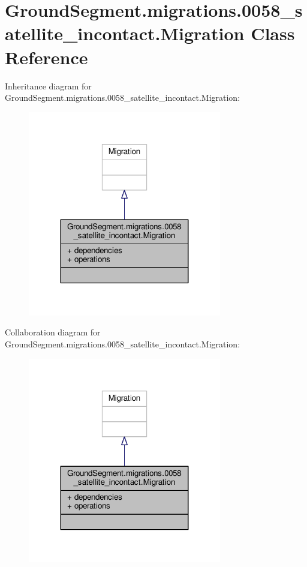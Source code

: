 \hypertarget{class_ground_segment_1_1migrations_1_10058__satellite__incontact_1_1_migration}{}\section{Ground\+Segment.\+migrations.0058\+\_\+satellite\+\_\+incontact.Migration Class Reference}
\label{class_ground_segment_1_1migrations_1_10058__satellite__incontact_1_1_migration}


Inheritance diagram for Ground\+Segment.\+migrations.0058\+\_\+satellite\+\_\+incontact.Migration\+:\nopagebreak
\begin{figure}[H]
\begin{center}
\leavevmode
\includegraphics[width=239pt]{class_ground_segment_1_1migrations_1_10058__satellite__incontact_1_1_migration__inherit__graph}
\end{center}
\end{figure}


Collaboration diagram for Ground\+Segment.\+migrations.0058\+\_\+satellite\+\_\+incontact.Migration\+:\nopagebreak
\begin{figure}[H]
\begin{center}
\leavevmode
\includegraphics[width=239pt]{class_ground_segment_1_1migrations_1_10058__satellite__incontact_1_1_migration__coll__graph}
\end{center}
\end{figure}
